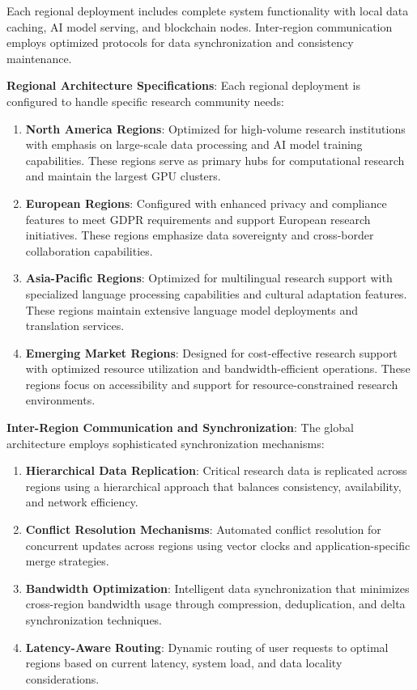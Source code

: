\documentclass[10pt,twocolumn]{article}
\begin{document}
Each regional deployment includes complete system functionality with local data caching, AI model serving, and blockchain nodes. Inter-region communication employs optimized protocols for data synchronization and consistency maintenance.

\textbf{Regional Architecture Specifications}: Each regional deployment is configured to handle specific research community needs:

\begin{enumerate}
    \item \textbf{North America Regions}: Optimized for high-volume research institutions with emphasis on large-scale data processing and AI model training capabilities. These regions serve as primary hubs for computational research and maintain the largest GPU clusters.
    
    \item \textbf{European Regions}: Configured with enhanced privacy and compliance features to meet GDPR requirements and support European research initiatives. These regions emphasize data sovereignty and cross-border collaboration capabilities.
    
    \item \textbf{Asia-Pacific Regions}: Optimized for multilingual research support with specialized language processing capabilities and cultural adaptation features. These regions maintain extensive language model deployments and translation services.
    
    \item \textbf{Emerging Market Regions}: Designed for cost-effective research support with optimized resource utilization and bandwidth-efficient operations. These regions focus on accessibility and support for resource-constrained research environments.
\end{enumerate}

\textbf{Inter-Region Communication and Synchronization}: The global architecture employs sophisticated synchronization mechanisms:

\begin{enumerate}
    \item \textbf{Hierarchical Data Replication}: Critical research data is replicated across regions using a hierarchical approach that balances consistency, availability, and network efficiency.
    
    \item \textbf{Conflict Resolution Mechanisms}: Automated conflict resolution for concurrent updates across regions using vector clocks and application-specific merge strategies.
    
    \item \textbf{Bandwidth Optimization}: Intelligent data synchronization that minimizes cross-region bandwidth usage through compression, deduplication, and delta synchronization techniques.
    
    \item \textbf{Latency-Aware Routing}: Dynamic routing of user requests to optimal regions based on current latency, system load, and data locality considerations.
\end{enumerate}
\end{document}
